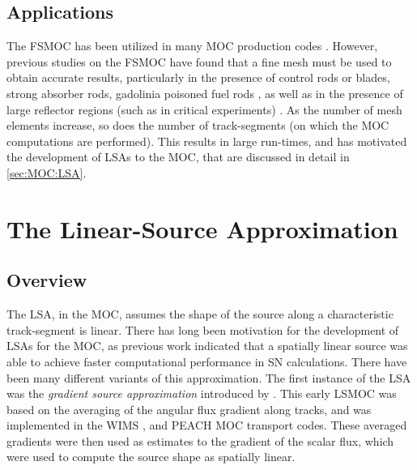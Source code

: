 {{        \subsection{Applications}{\label{ssec:FSA:Applications}
            The \ac{FSMOC} has been utilized in many \ac{MOC} production codes \cite{Halsall1980,Hong1998,Saji2000,Smith2002,Sugimura2006,Masiello2008,Boyd2014,Collins2016}.
            However, previous studies on the \ac{FSMOC} have found that a fine mesh must be used to obtain accurate results, particularly in the presence of control rods or blades, strong absorber rods, gadolinia poisoned fuel rods \cite{Petkov1999}, as well as in the presence of large reflector regions (such as in critical experiments) \cite{Ferrer2016}.
            As the number of mesh elements increase, so does the number of track-segments (on which the \ac{MOC} computations are performed).
            This results in large run-times, and has motivated the development of \acfp{LSA} to the \ac{MOC}, that are discussed in detail in \cref{sec:MOC:LSA}.
        }
    }
    \section{The Linear-Source Approximation}{\label{sec:MOC:LSA}
        \subsection{Overview}{\label{ssec:MOC:LSA:Overview}
            The \acf{LSA}, in the \ac{MOC}, assumes the shape of the source along a characteristic track-segment is linear.
            There has long been motivation for the development of \acp{LSA} for the \ac{MOC}, as previous work \cite{Larsen1980} indicated that a spatially linear source was able to achieve faster computational performance in \ac{SN} calculations.
            There have been many different variants of this approximation.
            The first instance of the \ac{LSA} was the \emph{gradient source approximation} introduced by \citet{Halsall1993}.
            This early \ac{LSMOC} was based on the averaging of the angular flux gradient along tracks, and was implemented in the WIMS \cite{Halsall1993}, and PEACH \cite{Tang2009} \ac{MOC} transport codes.
            These averaged gradients were then used as estimates to the gradient of the scalar flux, which were used to compute the source shape as spatially linear.

}}}
